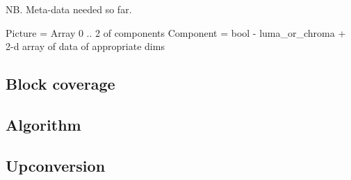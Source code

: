 

\providecommand{\pic}[0]{\text{\texttt{pic}}}
\providecommand{\block}[0]{\text{\texttt{block}}}
\providecommand{\refs}[0]{\text{\texttt{refs}}}
\providecommand{\mcparams}[0]{\text{\texttt{mc\_params}}}
\providecommand{\mcfunc}[0]{\text{\texttt{motion\_compensate()}}}
\providecommand{\compmc}[0]{\text{\texttt{component\_compensate()}}}

\providecommand{\URef}[0]{\mathfrak{R}}
\providecommand{\picWidth}[0]{\text{\texttt{pic\_width}}}
\providecommand{\picHeight}[0]{\text{\texttt{pic\_height}}}
\providecommand{\W}[0]{\text{\texttt{W}}}
\providecommand{\xblen}[0]{\text{\texttt{xblen}}}
\providecommand{\yblen}[0]{\text{\texttt{yblen}}}
\providecommand{\xbsep}[0]{\text{\texttt{xbsep}}}
\providecommand{\ybsep}[0]{\text{\texttt{ybsep}}}
\providecommand{\gmA}[0]{\pmb{\text{A}}}
\providecommand{\gmB}[0]{\pmb{\text{b}}}
\providecommand{\gmC}[0]{\pmb{\text{c}}}
\providecommand{\B}[0]{\text{\texttt{b}}}
\providecommand{\Bx}[0]{\text{\texttt{b.x}}}
\providecommand{\By}[0]{\text{\texttt{b.y}}}
\providecommand{\Bpredmode}[0]{\text{\texttt{b.predmode}}}
\providecommand{\predIntra}[0]{\text{Intra}}
\providecommand{\predInter}[0]{\text{Inter}}
\providecommand{\predGlobal}[0]{\text{Global}}
\providecommand{\Brefsinuse}[0]{\text{\texttt{b.refsinuse}}}
\providecommand{\Bdc}[0]{\text{\texttt{b.dc}}}
\providecommand{\Bv}[0]{\text{\texttt{b.v}}}

NB. Meta-data needed so far.

Picture = Array 0 .. 2 of components
Component = bool - luma_or_chroma + 2-d array of data of appropriate dims


\subsection{Block coverage}
\subsection{Algorithm}
\subsection{Upconversion}
